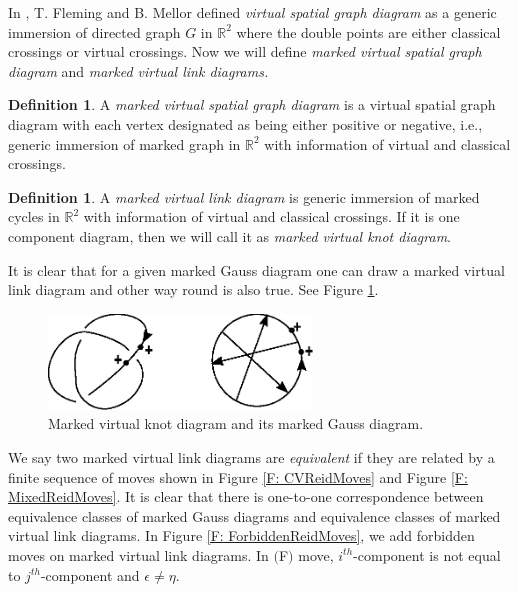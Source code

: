 \documentclass[11 pt, reqno]{amsart}
\theoremstyle{definition}
\newtheorem{definition}[theorem]{Definition}
\numberwithin{equation}{subsection}
\newcommand{\RNum}[1]{\uppercase\expandafter{\romannumeral #1\relax}}
\begin{document}
In \cite{FM-1}, T. Fleming and B. Mellor defined {\it virtual spatial graph diagram} as a generic immersion of directed graph $G$ in $\mathbb{R}^2$ where the double points are either classical crossings or virtual crossings. Now we will define {\it marked virtual spatial graph diagram} and {\it marked virtual link diagrams.}
\begin{definition}
A {\it marked virtual spatial graph diagram} is a virtual spatial graph diagram with each vertex designated as being either positive or negative, i.e., generic immersion of marked graph in $\mathbb{R}^2$ with information of virtual and classical crossings.
\end{definition}

\begin{definition}
A {\it marked virtual link diagram} is generic immersion of marked cycles in $\mathbb{R}^2$ with information of virtual and classical crossings. If it is one component diagram, then we will call it as {\it marked virtual knot diagram}.
\end{definition}

It is clear that for a given marked Gauss diagram one can draw a marked virtual link diagram and other way round is also true. See Figure \ref{F: MGDandMVLD}.

\begin{figure}[H]
\includegraphics[width=7cm]{MGDandMVLD.eps}
\caption{Marked virtual knot diagram and its marked Gauss diagram.} \label{F: MGDandMVLD}
\end{figure}

We say two marked virtual link diagrams are {\it equivalent} if they are related by a finite sequence of moves shown in Figure \ref{F: CVReidMoves} and Figure \ref{F: MixedReidMoves}. It is clear that there is one-to-one correspondence between equivalence classes of marked Gauss diagrams and equivalence classes of marked virtual link diagrams. In Figure \ref{F: ForbiddenReidMoves}, we add forbidden moves on marked virtual link diagrams. In $($F\RNum{2}$)$ move, $i^{th}$-component is not equal to $j^{th}$-component and $\epsilon \neq \eta$.
\end{document}
